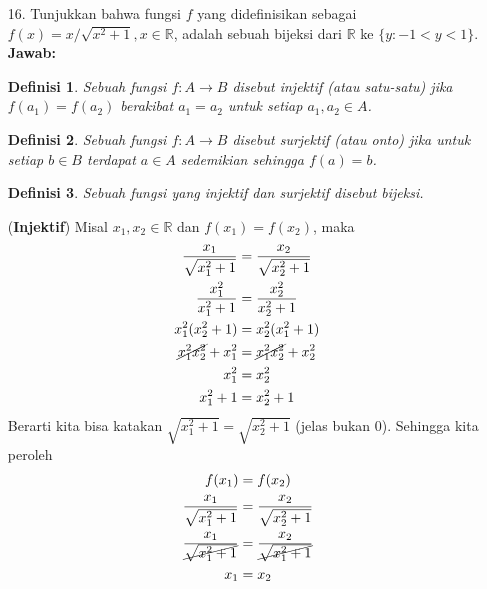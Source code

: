 \documentclass[10pt,openany,a4paper]{article}
\newtheorem{definisi}{Definisi}
\newcommand{\R}{\mathbb{R}}
\begin{document}
\begin{enumerate}
  \item[16.] Tunjukkan bahwa fungsi $f$ yang didefinisikan sebagai $f(x)=x/\sqrt{x^2+1},x\in\R$, adalah sebuah bijeksi dari $\R$ ke $\{y:-1<y<1\}$.\\
        \textbf{Jawab:}
        \begin{definisi}
          Sebuah fungsi $f:A\to B$ disebut \textit{injektif} (atau satu-satu) jika $f(a_1)=f(a_2)$ berakibat $a_1=a_2$ untuk setiap $a_1,a_2\in A$.
        \end{definisi}
        \begin{definisi}
          Sebuah fungsi $f:A\to B$ disebut \textit{surjektif} (atau onto) jika untuk setiap $b\in B$ terdapat $a\in A$ sedemikian sehingga $f(a)=b$.
        \end{definisi}
        \begin{definisi}
          Sebuah fungsi yang injektif dan surjektif disebut \textit{bijeksi}.
        \end{definisi}
        (\textbf{Injektif}) Misal $x_1,x_2\in\R$ dan $f(x_1)=f(x_2)$, maka
        \begin{align*}
          \frac{x_1}{\sqrt{x_1^2+1}} & =\frac{x_2}{\sqrt{x_2^2+1}} \\
          \frac{x_1^2}{x_1^2+1}      & =\frac{x_2^2}{x_2^2+1}      \\
          x_1^2(x_2^2+1)             & =x_2^2(x_1^2+1)             \\
          \cancel{x_1^2x_2^2}+x_1^2  & =\cancel{x_1^2x_2^2}+x_2^2  \\
          x_1^2                      & =x_2^2                      \\
          x_1^2 +1                   & =x_2^2 +1
        \end{align*}
        Berarti kita bisa katakan $\sqrt{x_1^2+1}=\sqrt{x_2^2+1}$ (jelas bukan 0). Sehingga kita peroleh
        \begin{align*}
          f(x_1)                              & =f(x_2)                              \\
          \frac{x_1}{\sqrt{x_1^2+1}}          & =\frac{x_2}{\sqrt{x_2^2+1}}          \\
          \frac{x_1}{\cancel{\sqrt{x_1^2+1}}} & =\frac{x_2}{\cancel{\sqrt{x_1^2+1}}} \\
          x_1                                 & =x_2
        \end{align*}


\end{enumerate}
\end{document}
